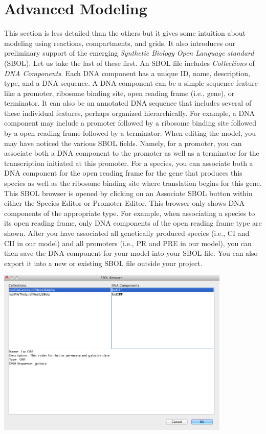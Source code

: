 \documentclass[titlepage,11pt]{article}
\begin{document}
\section{Advanced Modeling}

This section is less detailed than the others but it gives some intuition about modeling using reactions, compartments, and grids.  It also introduces our preliminary support of the emerging \emph{Synthetic Biology Open Language standard} (SBOL).  Let us take the last of these first.  An SBOL file includes \emph{Collections} of \emph{DNA Components}.  Each DNA component has a unique ID, name, description, type, and a DNA sequence.  A DNA component can be a simple sequence feature like a promoter, ribosome binding site, open reading frame (i.e., gene), or terminator.  It can also be an annotated DNA sequence that includes several of these individual features, perhaps organized hierarchically.  For example, a DNA component may include a promoter followed by a ribosome binding site followed by a open reading frame followed by a terminator.  When editing the model, you may have noticed the various SBOL fields.  Namely, for a promoter, you can associate both a DNA component to the promoter as well as a terminator for the transcription initiated at this promoter.  For a species, you can associate both a DNA component for the open reading frame for the gene that produces this species as well as the ribosome binding site where translation begins for this gene.  This SBOL browser is opened by clicking on an Associate SBOL button within either the Species Editor or Promoter Editor.  This browser only shows DNA components of the appropriate type.  For example, when associating a species to its open reading frame, only DNA components of the open reading frame type are shown.  After you have associated all genetically produced species (i.e., CI and CII in our model) and all promoters (i.e., PR and PRE in our model), you can then save the DNA component for your model into your SBOL file.  You can also export it into a new or existing SBOL file outside your project.

\begin{center}
\includegraphics[height=80mm]{screenshots/AssociateSBOL}
\end{center}
\end{document}
